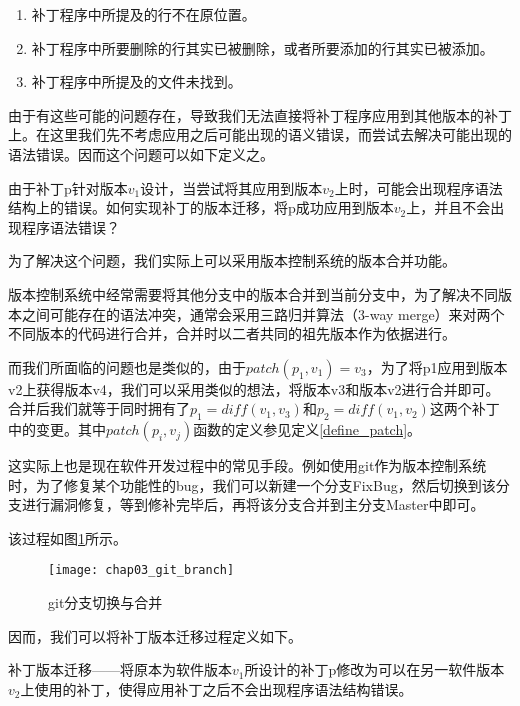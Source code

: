\begin{enumerate}
	\item 补丁程序中所提及的行不在原位置。
	\item 补丁程序中所要删除的行其实已被删除，或者所要添加的行其实已被添加。
	\item 补丁程序中所提及的文件未找到。
\end{enumerate}

由于有这些可能的问题存在，导致我们无法直接将补丁程序应用到其他版本的补丁上。在这里我们先不考虑应用之后可能出现的语义错误，而尝试去解决可能出现的语法错误。因而这个问题可以如下定义之。

\begin{problem}
	\label {patch_reversion}
	由于补丁p针对版本$v_{1}$设计，当尝试将其应用到版本$v_{2}$上时，可能会出现程序语法结构上的错误。如何实现补丁的版本迁移，将p成功应用到版本$v_{2}$上，并且不会出现程序语法错误？
\end{problem}

为了解决这个问题，我们实际上可以采用版本控制系统的版本合并功能。

版本控制系统中经常需要将其他分支中的版本合并到当前分支中，为了解决不同版本之间可能存在的语法冲突，通常会采用三路归并算法（3-way merge）来对两个不同版本的代码进行合并，合并时以二者共同的祖先版本作为依据进行。

而我们所面临的问题也是类似的，由于$patch(p_1,v_1) = v_3$，为了将p1应用到版本v2上获得版本v4，我们可以采用类似的想法，将版本v3和版本v2进行合并即可。合并后我们就等于同时拥有了$p_1 = diff(v_1,v_3)$和$p_2 = diff(v_1,v_2)$这两个补丁中的变更。其中$patch(p_i,v_j)$函数的定义参见定义\ref {define_patch}。

这实际上也是现在软件开发过程中的常见手段。例如使用git作为版本控制系统时，为了修复某个功能性的bug，我们可以新建一个分支FixBug，然后切换到该分支进行漏洞修复，等到修补完毕后，再将该分支合并到主分支Master中即可。

该过程如图\ref{git_branch}所示。

\begin{figure}[H]	
	\centering
	\texttt{[image: chap03\_git\_branch]}
	\caption {git分支切换与合并}	
	\label {git_branch}
\end{figure}

因而，我们可以将补丁版本迁移过程定义如下。

\begin{definition}
	补丁版本迁移——将原本为软件版本$v_1$所设计的补丁p修改为可以在另一软件版本$v_2$上使用的补丁，使得应用补丁之后不会出现程序语法结构错误。
\end{definition}

